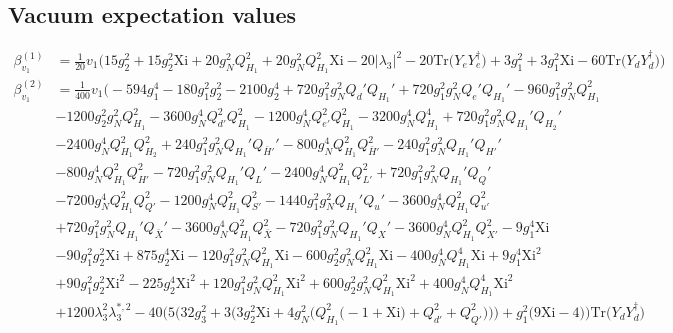 \subsection{Vacuum expectation values}
{\allowdisplaybreaks  \begin{align} 
\beta_{v_1}^{(1)} & =  
\frac{1}{20} v_1 \Big(15 g_{2}^{2}  + 15 g_{2}^{2} \text{Xi}  + 20 g_{N}^{2} Q_{H_1}^{2}  + 20 g_{N}^{2} Q_{H_1}^{2} \text{Xi}  -20 |\lambda_3|^2  -20 \mbox{Tr}\Big({Y_e  Y_{e}^{\dagger}}\Big)  + 3 g_{1}^{2}  + 3 g_{1}^{2} \text{Xi}  -60 \mbox{Tr}\Big({Y_d  Y_{d}^{\dagger}}\Big) \Big)\\ 
\beta_{v_1}^{(2)} & =  
\frac{1}{400} v_1 \Big(-594 g_{1}^{4} -180 g_{1}^{2} g_{2}^{2} -2100 g_{2}^{4} +720 g_{1}^{2} g_{N}^{2} Q_d' Q_{H_1}' +720 g_{1}^{2} g_{N}^{2} Q_e' Q_{H_1}' -960 g_{1}^{2} g_{N}^{2} Q_{H_1}^{2} \nonumber \\ 
 &-1200 g_{2}^{2} g_{N}^{2} Q_{H_1}^{2} -3600 g_{N}^{4} Q_{d'}^{2} Q_{H_1}^{2} -1200 g_{N}^{4} Q_{e'}^{2} Q_{H_1}^{2} -3200 g_{N}^{4} Q_{H_1}^{4} +720 g_{1}^{2} g_{N}^{2} Q_{H_1}' Q_{H_2}' \nonumber \\ 
 &-2400 g_{N}^{4} Q_{H_1}^{2} Q_{H_2}^{2} +240 g_{1}^{2} g_{N}^{2} Q_{H_1}' Q_{\bar{H}'}' -800 g_{N}^{4} Q_{H_1}^{2} Q_{\bar{H}'}^{2} -240 g_{1}^{2} g_{N}^{2} Q_{H_1}' Q_{H'}' \nonumber \\ 
 &-800 g_{N}^{4} Q_{H_1}^{2} Q_{H'}^{2} -720 g_{1}^{2} g_{N}^{2} Q_{H_1}' Q_L' -2400 g_{N}^{4} Q_{H_1}^{2} Q_{L'}^{2} +720 g_{1}^{2} g_{N}^{2} Q_{H_1}' Q_Q' \nonumber \\ 
 &-7200 g_{N}^{4} Q_{H_1}^{2} Q_{Q'}^{2} -1200 g_{N}^{4} Q_{H_1}^{2} Q_{S'}^{2} -1440 g_{1}^{2} g_{N}^{2} Q_{H_1}' Q_u' -3600 g_{N}^{4} Q_{H_1}^{2} Q_{u'}^{2} \nonumber \\ 
 &+720 g_{1}^{2} g_{N}^{2} Q_{H_1}' Q_{\bar{X}}' -3600 g_{N}^{4} Q_{H_1}^{2} Q_{\bar{X}}^{2} -720 g_{1}^{2} g_{N}^{2} Q_{H_1}' Q_X' -3600 g_{N}^{4} Q_{H_1}^{2} Q_{X'}^{2} -9 g_{1}^{4} \text{Xi} \nonumber \\ 
 &-90 g_{1}^{2} g_{2}^{2} \text{Xi} +875 g_{2}^{4} \text{Xi} -120 g_{1}^{2} g_{N}^{2} Q_{H_1}^{2} \text{Xi} -600 g_{2}^{2} g_{N}^{2} Q_{H_1}^{2} \text{Xi} -400 g_{N}^{4} Q_{H_1}^{4} \text{Xi} +9 g_{1}^{4} \text{Xi}^{2} \nonumber \\ 
 &+90 g_{1}^{2} g_{2}^{2} \text{Xi}^{2} -225 g_{2}^{4} \text{Xi}^{2} +120 g_{1}^{2} g_{N}^{2} Q_{H_1}^{2} \text{Xi}^{2} +600 g_{2}^{2} g_{N}^{2} Q_{H_1}^{2} \text{Xi}^{2} +400 g_{N}^{4} Q_{H_1}^{4} \text{Xi}^{2} \nonumber \\ 
 &+1200 \lambda_{3}^{2} \lambda_{3}^{*,2} -40 \Big(5 \Big(32 g_{3}^{2}  + 3 \Big(3 g_{2}^{2} \text{Xi}  + 4 g_{N}^{2} \Big(Q_{H_1}^{2} \Big(-1 + \text{Xi}\Big) + Q_{d'}^{2} + Q_{Q'}^{2}\Big)\Big)\Big) + g_{1}^{2} \Big(9 \text{Xi}  -4\Big)\Big)\mbox{Tr}\Big({Y_d  Y_{d}^{\dagger}}\Big) \nonumber \\ 

\end{align}}
